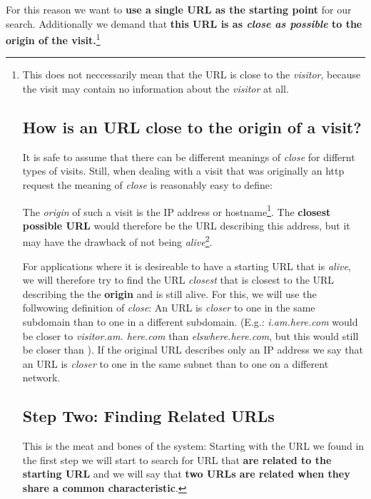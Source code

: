 \documentclass[a4paper]{danarticle}
\begin{document}
    For this reason we want to \textbf{use a single URL as the
    starting point} for our search. Additionally we demand that
    \textbf{this URL is as \textit{close as possible} to the
    origin of the visit.}\footnote{This does not neccessarily
    mean that the URL is close to the \textit{visitor}, because
    the visit may contain no information about the \textit{visitor}
    at all.
    
    \subsection*{How is an URL close to the origin of a visit?}
      It is safe to assume that there can be different meanings
      of \textit{close} for differnt types of visits. Still, when
      dealing with a visit that was originally an http request
      the meaning of \textit{close} is reasonably easy to define:
      
      The \textit{origin} of such a visit is the IP address or
      hostname\footnote{For the sake of convenience we will simply
      assume that whenever possible an IP addess will be translated
      into a valid DNS hostname.}. The \textbf{closest possible URL}
      would therefore be the URL describing this address, but it
      may have the drawback of not being \textit{alive}\footnote{We
      will call an URL \textit{alive} when there is a HTTP server
      answering GET or HEAD requests for this URL.}.
      
      For applications where it is desireable to have a starting
      URL that is \textit{alive}, we will therefore try to find the
      URL \textit{closest} that is closest to the URL describing
      the the \textbf{origin} and is still alive. For this, we 
      will use the follwowing definition of \textit{close}:
      An URL is \textit{closer} to one in the same subdomain 
      than to one in a different subdomain. (E.g.: \textit{i.am.here.com}
      would be closer to \textit{visitor.am. here.com} than
      \textit{elswhere.here.com}, but this would still be closer than
      ). If the original URL describes only
      an IP address we say that an URL is \textit{closer} to one
      in the same subnet than to one on a different network.
  \section*{Step Two: Finding Related URLs}
     This is the meat and bones of the system: Starting with the
     URL we found in the first step we will start to search for
     URL that \textbf{are related to the starting URL}
     and we will say that
     \textbf{two URLs are related when they share a common
     characteristic}. 
     
}
\end{document}
